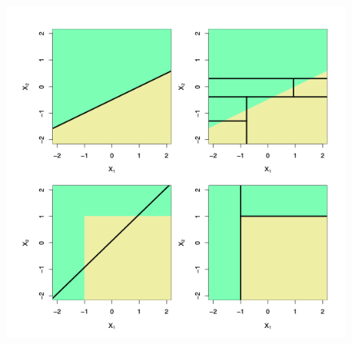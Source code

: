 \documentclass[
  shownotes,
  xcolor={svgnames},
  hyperref={colorlinks,citecolor=DarkBlue,linkcolor=DarkRed,urlcolor=DarkBlue}
  , aspectratio=169]{beamer}
\begin{document}
\begin{frame}[fragile]
\begin{columns}[T]
\begin{column}{.48\textwidth}
 \begin{figure}[H] \centering
            \captionsetup{justification=centering}
              \includegraphics[scale=0.55]{figures/tree_vs_reg}
 \end{figure}

\end{column}
\end{columns}




\end{frame}
\end{document}
